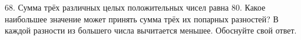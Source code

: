 68. Сумма трёх различных целых положительных чисел равна 80. Какое наибольшее значение может принять сумма трёх их попарных разностей? В каждой разности из большего числа вычитается меньшее. Обоснуйте свой ответ.\\
